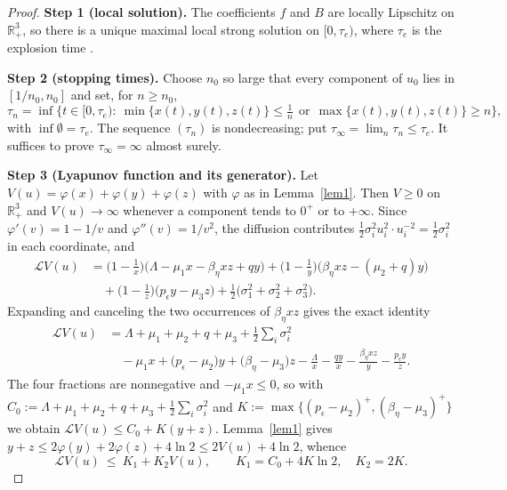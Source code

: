 \documentclass{article}
\newcommand{\betaeta}{\beta_\eta}
\newcommand{\peps}{p_\epsilon}
\begin{document}
\begin{proof}
\textbf{Step 1 (local solution).} The coefficients $f$ and $B$ are locally Lipschitz on $\mathbb{R}^3_+$, so there is a unique maximal local strong solution on $[0,\tau_e)$, where $\tau_e$ is the explosion time \citep[Thm.~2.3.5]{Ref1}.

\textbf{Step 2 (stopping times).} Choose $n_0$ so large that every component of $u_0$ lies in $[1/n_0,n_0]$ and set, for $n\ge n_0$,
\[
\tau_n = \inf\Big\{t\in[0,\tau_e):\ \min\{x(t),y(t),z(t)\}\le \tfrac1n\ \ \text{or}\ \ \max\{x(t),y(t),z(t)\}\ge n\Big\},
\]
with $\inf\emptyset=\tau_e$. The sequence $(\tau_n)$ is nondecreasing; put $\tau_\infty=\lim_n\tau_n\le\tau_e$. It suffices to prove $\tau_\infty=\infty$ almost surely.

\textbf{Step 3 (Lyapunov function and its generator).} Let $V(u)=\varphi(x)+\varphi(y)+\varphi(z)$ with $\varphi$ as in Lemma~\ref{lem1}. Then $V\ge0$ on $\mathbb{R}^3_+$ and $V(u)\to\infty$ whenever a component tends to $0^+$ or to $+\infty$. Since $\varphi'(v)=1-1/v$ and $\varphi''(v)=1/v^2$, the diffusion contributes $\tfrac12\sigma_i^2u_i^2\cdot u_i^{-2}=\tfrac12\sigma_i^2$ in each coordinate, and
\begin{align*}
\mathcal{L}V(u) &= \Big(1-\tfrac1x\Big)\big(\Lambda-\mu_1x-\betaeta xz+qy\big) + \Big(1-\tfrac1y\Big)\big(\betaeta xz-(\mu_2+q)y\big)\\
&\quad + \Big(1-\tfrac1z\Big)\big(\peps y-\mu_3z\big) + \tfrac12\big(\sigma_1^2+\sigma_2^2+\sigma_3^2\big).
\end{align*}
Expanding and canceling the two occurrences of $\betaeta xz$ gives the exact identity
\begin{align}
\mathcal{L}V(u) &= \Lambda+\mu_1+\mu_2+q+\mu_3+\tfrac12\textstyle\sum_i\sigma_i^2 \nonumber\\
&\quad -\mu_1x + \big(\peps-\mu_2\big)y + \big(\betaeta-\mu_3\big)z - \frac{\Lambda}{x}-\frac{qy}{x}-\frac{\betaeta xz}{y}-\frac{\peps y}{z}. \label{eq:LV_exact}
\end{align}
The four fractions are nonnegative and $-\mu_1x\le0$, so with $C_0:=\Lambda+\mu_1+\mu_2+q+\mu_3+\tfrac12\sum_i\sigma_i^2$ and $K:=\max\{(\peps-\mu_2)^+,(\betaeta-\mu_3)^+\}$ we obtain $\mathcal{L}V(u)\le C_0+K(y+z)$. Lemma~\ref{lem1} gives $y+z\le 2\varphi(y)+2\varphi(z)+4\ln2\le 2V(u)+4\ln 2$, whence
\begin{equation}\label{eq:LV_linear}
\mathcal{L}V(u)\ \le\ K_1+K_2V(u),\qquad K_1=C_0+4K\ln 2,\quad K_2=2K .
\end{equation}


\end{proof}
\end{document}
